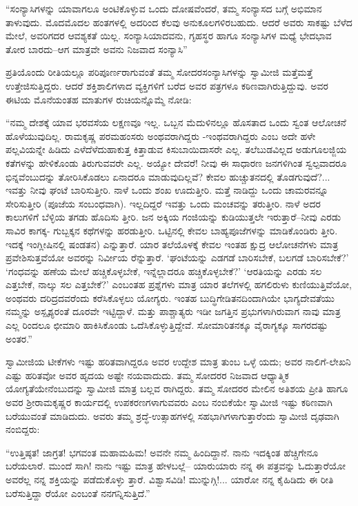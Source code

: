 “ಸಂನ್ಯಾಸಿಗಳನ್ನು ಯಾವಾಗಲೂ ಅಂಟಿಕೊಳ್ಳುವ ಒಂದು ದೋಷವೆಂದರೆ, ತಮ್ಮ ಸಂನ್ಯಾಸದ ಬಗ್ಗೆ ಅಭಿಮಾನ ತಾಳುವುದು. ಮೊದಮೊದಲ ಹಂತಗಳಲ್ಲಿ ಅದರಿಂದ ಕೆಲವು ಅನುಕೂಲಗಳಿರಬಹುದು. ಆದರೆ ಅವರು ಸಾಕಷ್ಟು ಬೆಳೆದ ಮೇಲೆ, ಅವರಿಗದರ ಆವಶ್ಯಕತೆ ಯಿಲ್ಲ. ಸಂನ್ಯಾಸಿಯಾದವನು, ಗೃಹಸ್ಥರ ಹಾಗೂ ಸಂನ್ಯಾಸಿಗಳ ಮಧ್ಯೆ ಭೇದಭಾವ ತೋರ ಬಾರದು–ಆಗ ಮಾತ್ರವೇ ಅವನು ನಿಜವಾದ ಸಂನ್ಯಾಸಿ”

ಪ್ರತಿಯೊಂದು ರೀತಿಯಲ್ಲೂ ಪರಿಪೂರ್ಣರಾಗುವಂತೆ ತಮ್ಮ ಸೋದರಸಂನ್ಯಾಸಿಗಳನ್ನು ಸ್ವಾಮೀಜಿ ಮತ್ತೆಮತ್ತೆ ಉತ್ತೇಜಿಸುತ್ತಿದ್ದರು. ಆದರೆ ಶಕ್ತಿಶಾಲಿಗಳಾದ ವ್ಯಕ್ತಿಗಳಿಗೆ ಬರೆದ ಅವರ ಪತ್ರಗಳೂ ಕಠಿಣವಾಗಿರುತ್ತಿದ್ದುವು. ಅವರ ಈಟಿಯ ಮೊನೆಯಂತಹ ಮಾತುಗಳ ರುಚಿಯನ್ನೊಮ್ಮೆ ನೋಡಿ:

“ನಮ್ಮ ದೇಶಕ್ಕೆ ಯಾವ ಭರವಸೆಯ ಲಕ್ಷಣವೂ ಇಲ್ಲ. ಒಬ್ಬನ ಮೆದುಳಿನಲ್ಲೂ ಹೊಸತಾದ ಒಂದು ಸ್ವಂತ ಆಲೋಚನೆ ಹೊಳೆಯುವುದಿಲ್ಲ. ರಾಮಕೃಷ್ಣ ಪರಮಹಂಸರು ಅಂಥವರಾಗಿದ್ದರು -ಇಂಥವರಾಗಿದ್ದರು ಎಂಬ ಅದೇ ಹಳೇ ಪಲ್ಲವಿಯನ್ನೇ ಹಿಡಿದು ಎಳೆದೆಳೆದುಹಾಕುತ್ತ ಕಿತ್ತಾಡುವ ಕಿಸುಬಾಯಿದಾಸರೇ ಎಲ್ಲ. ತಲೆಬುಡವಿಲ್ಲದ ಅಡುಗೂಲಜ್ಜಿಯ ಕತೆಗಳನ್ನು ಹೇಳಿಕೊಂಡು ತಿರುಗುವವರೇ ಎಲ್ಲ. ಅಯ್ಯೋ ದೇವರೆ! ನೀವು ಈ ಸಾಧಾರಣ ಜನಗಳಿಗಿಂತ ಸ್ವಲ್ಪವಾದರೂ ಭಿನ್ನವೆಂಬುದನ್ನು ತೋರಿಸಿಕೊಡಲು ಏನಾದರೂ ಮಾಡುವುದಿಲ್ಲವೆ? ಕೇವಲ ಹುಚ್ಚುತನದಲ್ಲಿ ತೊಡಗುವುದೆ?... ಇವತ್ತು ನೀವು ಘಂಟೆ ಬಾರಿಸುತ್ತೀರಿ. ನಾಳೆ ಒಂದು ಶಂಖ ಊದುತ್ತೀರಿ. ಮತ್ತೆ ನಾಡಿದ್ದು ಒಂದು ಚಾಮರವನ್ನೂ ಸೇರಿಸುತ್ತೀರಿ (ಪೂಜೆಯ ಸಂಬಂಧವಾಗಿ). ಇಲ್ಲದಿದ್ದರೆ ಇವತ್ತು ಒಂದು ಮಂಚವನ್ನು ತರುತ್ತೀರಿ. ನಾಳೆ ಅದರ ಕಾಲುಗಳಿಗೆ ಬೆಳ್ಳಿಯ ತಗಡು ಹೊದಿಸು ತ್ತೀರಿ. ಜನ ಅಕ್ಕಿಯ ಗಂಜಿಯನ್ನು ಕುಡಿಯುತ್ತಲೇ ಇರುತ್ತಾರೆ–ನೀವು ಎರಡು ಸಾವಿರ ಕಾಗಕ್ಕ- ಗುಬ್ಬಕ್ಕನ ಕಥೆಗಳನ್ನು ಹರಡುತ್ತೀರಿ. ಒಟ್ಟಿನಲ್ಲಿ ಕೇವಲ ಬಾಹ್ಯಪೂಜೆಗಳನ್ನು ಮಾಡಿಕೊಂಡಿರು ತ್ತೀರಿ. ಇದಕ್ಕೆ ಇಂಗ್ಲೀಷಿನಲ್ಲಿ ಷಂಡತನ) ಎನ್ನುತ್ತಾರೆ. ಯಾರ ತಲೆಯೊಳಕ್ಕೆ ಕೇವಲ ಇಂತಹ ಕ್ಷುದ್ರ ಆಲೋಚನೆಗಳು ಮಾತ್ರ ಪ್ರವೇಶಿಸುತ್ತವೆಯೋ ಅವರನ್ನು ನಿರ್ವೀಯ ರೆನ್ನುತ್ತಾರೆ. ‘ಘಂಟೆಯನ್ನು ಎಡಗಡೆ ಬಾರಿಸಬೇಕೆ, ಬಲಗಡೆ ಬಾರಿಸಬೇಕೆ?’ ‘ಗಂಧವನ್ನು ಹಣೆಯ ಮೇಲೆ ಹಚ್ಚಿಕೊಳ್ಳಬೇಕೆ, ಇನ್ನೆಲ್ಲಾದರೂ ಹಚ್ಚಿಕೊಳ್ಳಬೇಕೆ?’ ‘ಆರತಿಯನ್ನು ಎರಡು ಸಲ ಎತ್ತಬೇಕೆ, ನಾಲ್ಕು ಸಲ ಎತ್ತಬೇಕೆ?’ ಎಂಬಂತಹ ಪ್ರಶ್ನೆಗಳು ಮಾತ್ರ ಯಾರ ತಲೆಗಳಲ್ಲಿ ಹಗಲಿರುಳು ಕುಣಿಯುತ್ತಿವೆಯೋ, ಅಂಥವರು ದರಿದ್ರದವರೆಂದು ಕರೆಸಿಕೊಳ್ಳಲು ಯೋಗ್ಯರು. ಇಂತಹ ಬುದ್ಧಿಗೇಡಿತನದಿಂದಾಗಿಯೇ ಭಾಗ್ಯದೇವತೆಯು ನಮ್ಮನ್ನು ಅಸ್ಪೃಶ್ಯರಂತೆ ದೂರವೇ ಇಟ್ಟಿದ್ದಾಳೆ. ಮತ್ತು ಪಾಶ್ಚಾತ್ಯರು ಇಡೀ ಜಗತ್ತಿನ ಪ್ರಭುಗಳಾಗಿರುವಾಗ ನಾವು ಮಾತ್ರ ಎಲ್ಲ ರಿಂದಲೂ ಛೀಮಾರಿ ಹಾಕಿಸಿಕೊಂಡು ಒದೆಸಿಕೊಳ್ಳುತ್ತಿದ್ದೇವೆ. ಸೋಮಾರಿತನಕ್ಕೂ ವೈರಾಗ್ಯಕ್ಕೂ ಸಾಗರದಷ್ಟು ಅಂತರ.”

ಸ್ವಾಮೀಜಿಯ ಟೀಕೆಗಳು ಇಷ್ಟು ಹರಿತವಾಗಿದ್ದರೂ ಅವರ ಉದ್ದೇಶ ಮಾತ್ರ ತುಂಬ ಒಳ್ಳೆ ಯದು; ಅವರ ನಾಲಿಗೆ-ಲೇಖನಿ ಎಷ್ಟು ಹರಿತವೋ ಅವರ ಹೃದಯ ಅಷ್ಟೇ ನಯವಾದುದು. ತಮ್ಮ ಸೋದರರ ನಿಜವಾದ ಆಧ್ಯಾತ್ಮಿಕ ಯೋಗ್ಯತೆಯೇನೆಂಬುದನ್ನು ಸ್ವಾಮೀಜಿ ಮಾತ್ರ ಬಲ್ಲವ ರಾಗಿದ್ದರು. ತಮ್ಮ ಸೋದರರ ಮೇಲಿನ ಅತಿಶಯ ಪ್ರೀತಿ ಹಾಗೂ ಅವರ ಶ್ರೀರಾಮಕೃಷ್ಣರ ಕಾರ್ಯದಲ್ಲಿ ಉಪಕರಣಗಳಾಗುವವರು ಎಂಬ ನಂಬಿಕೆಯೇ ಸ್ವಾಮೀಜಿ ಇಷ್ಟು ಕಠಿಣವಾಗಿ ಬರೆಯುವಂತೆ ಮಾಡಿದುದು. ಅವರು ತಮ್ಮ ಶ್ರದ್ಧೆ-ಉತ್ಸಾಹಗಳಲ್ಲಿ ಸಹಭಾಗಿಗಳಾಗುತ್ತಾರೆಂದು ಸ್ವಾಮೀಜಿ ದೃಢವಾಗಿ ನಂಬಿದ್ದರು:

“ಉತ್ತಿಷ್ಠತ! ಜಾಗ್ರತ! ಭಗವಂತ ಮಹಾಮಹಿಮ! ಅವನೇ ನಮ್ಮ ಹಿಂದಿದ್ದಾನೆ. ನಾನು ಇದಕ್ಕಿಂತ ಹೆಚ್ಚಿಗೇನೂ ಬರೆಯಲಾರೆ. ಮುಂದೆ ಸಾಗಿ! ನಾನು ಇಷ್ಟು ಮಾತ್ರ ಹೇಳಬಲ್ಲೆ– ಯಾರುಯಾರು ನನ್ನ ಈ ಪತ್ರವನ್ನು ಓದುತ್ತಾರೆಯೋ ಅವರೆಲ್ಲ ನನ್ನ ಶಕ್ತಿಯನ್ನು ಪಡೆದುಕೊಳ್ಳು ತ್ತಾರೆ. ವಿಶ್ವಾಸವಿಡಿ! ಮುನ್ನುಗ್ಗಿ!... ಯಾರೋ ನನ್ನ ಕೈಹಿಡಿದು ಈ ರೀತಿ ಬರೆಸುತ್ತಿದ್ದಾ ರೆಯೋ ಎಂಬಂತೆ ನನಗನ್ನಿಸುತ್ತಿದೆ.”

